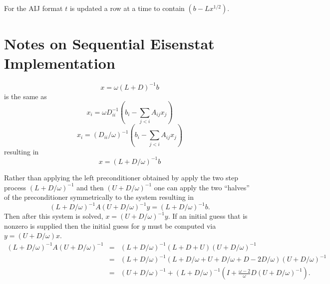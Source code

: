 \documentclass[11pt,english,pdftex]{article}
\begin{document}
For the AIJ format $t$ is updated a row at a time to contain $ (b - Lx^{1/2}).$


\section*{Notes on Sequential Eisenstat Implementation}


\[
  x = \omega (L + D)^{-1}b
\]
is the same as 
\[
   x_i = \omega D_{ii}^{-1}(b_i - \sum_{j<i} A_{ij} x_j)
\]
\[
   x_i = (D_{ii}/\omega)^{-1}(b_i - \sum_{j<i} A_{ij} x_j)
\]
resulting in
\[
  x =  (L + D/\omega)^{-1}b
\]

Rather than applying the left preconditioner obtained by apply the two step process $ (L + D/\omega)^{-1} $ and then $ (U + D/\omega)^{-1} $
one can apply the two ``halves'' of the preconditioner symmetrically to the system resulting in
\[
 (L + D/\omega)^{-1} A (U + D/\omega)^{-1} y = (L + D/\omega)^{-1} b.
\]
Then after this system is solved, $ x = (U + D/\omega)^{-1} y$. If an initial guess that is nonzero is supplied then the 
initial guess for $ y$ must be computed via $ y = (U + D/\omega) x$.
\begin{eqnarray*}
 (L + D/\omega)^{-1} A (U + D/\omega)^{-1} & =  & (L + D/\omega)^{-1} (L + D + U) (U + D/\omega)^{-1} \\
  & = &  (L + D/\omega)^{-1} (L + D/\omega + U + D/\omega + D - 2D/\omega) (U + D/\omega)^{-1} \\
  & = &  (U + D/\omega)^{-1} + (L+D/\omega)^{-1}(I + \frac{\omega - 2}{\omega}D(U + D/\omega)^{-1}).
\end{eqnarray*}
\end{document}

